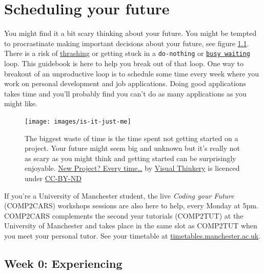 \documentclass[
]{book}
\begin{document}
\hypertarget{scheduling}{%
\chapter{Scheduling your future}\label{scheduling}}

You might find it a bit scary thinking about your future. You might be tempted to procrastinate making important decisions about your future, see figure \ref{fig:schedule-fig}. There is a risk of \href{https://en.wikipedia.org/wiki/Thrashing_(computer_science)}{thrashing} or getting stuck in a \texttt{do-nothing} or \href{https://en.wikipedia.org/wiki/Busy_waiting}{\texttt{busy\ waiting}} loop. This guidebook is here to help you break out of that loop. One way to breakout of an unproductive loop is to schedule some time every week where you work on personal development and job applications. Doing good applications takes time and you'll probably find you can't do as many applications as you might like.

\begin{figure}

{\centering \texttt{[image: images/is-it-just-me]} 

}

\caption{The biggest waste of time is the time spent not getting started on a project. Your future might seem big and unknown but it's really not as scary as you might think and getting started can be surprisingly enjoyable. \href{https://bryanmmathers.com/new-project-every-time/}{New Project? Every time\ldots{}} by \href{https://visualthinkery.com/}{Visual Thinkery} is licenced under \href{https://creativecommons.org/licenses/by-nd/4.0/}{CC-BY-ND}}\label{fig:schedule-fig}
\end{figure}



If you're a University of Manchester student, the live \emph{Coding your Future} (COMP2CARS) workshops sessions are also here to help, every Monday at 5pm. COMP2CARS complements the second year tutorials (COMP2TUT) at the University of Manchester and takes place in the same slot as COMP2TUT when you meet your personal tutor. See your timetable at \href{https://timetables.manchester.ac.uk/}{timetables.manchester.ac.uk}.

\hypertarget{week0}{%
\section{Week 0: Experiencing}\label{week0}}
\end{document}
